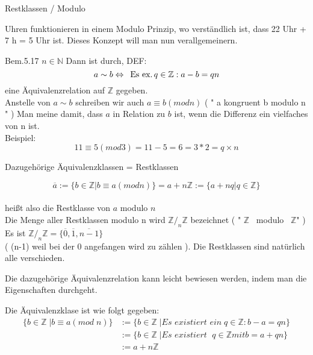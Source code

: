 \documentclass[smallheadings,12pt,a4paper]{scrartcl}
\begin{document}
\begin{center}
\item[Restklassen / Modulo]
\end{center}
\item Uhren funktionieren in einem Modulo Prinzip, wo verständlich ist, dass 22 Uhr + 7 h = 5 Uhr ist. Dieses Konzept will man nun verallgemeinern. \\
\item Bem.5.17 $n \in \mathbb{N} $ Dann ist durch, DEF: \\

$$ a \sim b \Leftrightarrow \text{\, Es ex.} \, q \in \mathbb{Z} : a-b = qn $$
eine Äquivalenzrelation auf $\mathbb{Z}$ gegeben. \\
Anstelle von $ a \sim b $ schreiben wir auch $ a\equiv b ( mod n ) $ ( " a kongruent b modulo n " )
Man meine damit, dass $a$ in Relation zu $b$ ist, wenn die Differenz ein vielfaches von n ist. \\
Beispiel: $$ 11 \equiv 5 (mod 3 ) = 11 - 5 = 6 = 3 * 2 = q \times n $$ 

\begin{center}
\item[Dazugehörige Äquivalenzklassen = Restklassen]
\end{center}
\item $$ \overline{a} := \{b\in \mathbb{Z} | b \equiv a (mod n) \} = a + n \mathbb{Z} := \{a+nq|q\in \mathbb{Z}\} $$ \\
heißt also die Restklasse von $ a $ modulo $ n $ \\
Die Menge aller Restklassen modulo n wird $ \mathbb{Z} /_n \mathbb{Z} $ bezeichnet ( " $\mathbb{Z}$ \, modulo \, $ \mathbb{Z} $" ) \\
Es ist $ \mathbb{Z} /_n \mathbb{Z} = \{\overline{0},\overline{1},\overline{n-1}\} $ \\
( (n-1) weil bei der 0 angefangen wird zu zählen ). Die Restklassen sind natürlich alle verschieden.

\item Die dazugehörige Äquivalenzrelation kann leicht bewiesen werden, indem man die Eigenschaften durchgeht.
\item Die Äquivalenzklase ist wie folgt gegeben: 
\begin{equation} 
 \begin{aligned} 
  \{b \in \mathbb{Z} \; | b \equiv a ( mod \; n ) \} &:= \{b \in \mathbb{Z} \; | \textit{Es existiert ein} \; q \in \mathbb{Z} : b-a =qn \} \\
  &:= \{b \in \mathbb{Z} \; | \textit{Es existiert } \; q \in \mathbb{Z} mit b = a+qn \} \\
  &:= a+n\mathbb{Z}   
 \end{aligned} 
\end{equation} 
\end{document}
